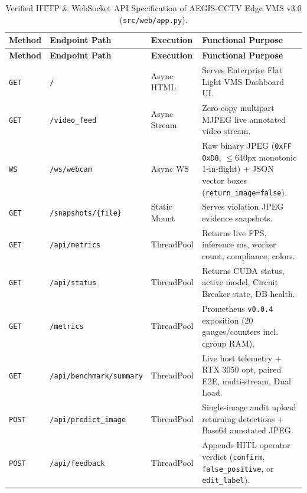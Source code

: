 \begingroup\scriptsize\setlength{\tabcolsep}{4pt}\renewcommand{\arraystretch}{1.06}
\begin{longtable}{|>{\centering\arraybackslash}p{1.4cm}|>{\raggedright\arraybackslash}p{4.8cm}|>{\raggedright\arraybackslash}p{1.7cm}|>{\raggedright\arraybackslash}p{5.8cm}|}
\caption{Verified HTTP \& WebSocket API Specification of AEGIS-CCTV Edge VMS v3.0 (\texttt{src/web/app.py}).}
\label{tab:app_rest_api} \\
\hline
\rowcolor{slatehdr}
\textbf{Method} & \textbf{Endpoint Path} & \textbf{Execution} & \textbf{Functional Purpose} \\
\hline
\endfirsthead
\hline
\rowcolor{slatehdr}
\textbf{Method} & \textbf{Endpoint Path} & \textbf{Execution} & \textbf{Functional Purpose} \\
\hline
\endhead
\hline
\endfoot
\texttt{GET}  & \texttt{/} & Async HTML & Serves Enterprise Flat Light VMS Dashboard UI. \\ \hline
\texttt{GET}  & \texttt{/video\_feed} & Async Stream & Zero-copy multipart MJPEG live annotated video stream. \\ \hline
\texttt{WS}   & \nolinkurl{/ws/webcam} & Async WS & Raw binary JPEG (\texttt{0xFF 0xD8}, $\le 640$px monotonic 1-in-flight) + JSON vector boxes (\nolinkurl{return_image=false}). \\ \hline
\texttt{GET}  & \texttt{/snapshots/\{file\}} & Static Mount & Serves violation JPEG evidence snapshots. \\ \hline
\texttt{GET}  & \texttt{/api/metrics} & ThreadPool & Returns live FPS, inference ms, worker count, compliance, colors. \\ \hline
\texttt{GET}  & \texttt{/api/status} & ThreadPool & Returns CUDA status, active model, Circuit Breaker state, DB health. \\ \hline
\texttt{GET}  & \texttt{/metrics} & ThreadPool & Prometheus \texttt{v0.0.4} exposition (20 gauges/counters incl. cgroup RAM). \\ \hline
\texttt{GET}  & \nolinkurl{/api/benchmark/summary} & ThreadPool & Live host telemetry + RTX 3050 opt, paired E2E, multi-stream, Dual Load. \\ \hline
\texttt{POST} & \nolinkurl{/api/predict_image} & ThreadPool & Single-image audit upload returning detections + Base64 annotated JPEG. \\ \hline
\texttt{POST} & \texttt{/api/feedback} & ThreadPool & Appends HITL operator verdict (\texttt{confirm}, \texttt{false\_positive}, or \texttt{edit\_label}). \\ \hline

\end{longtable}
